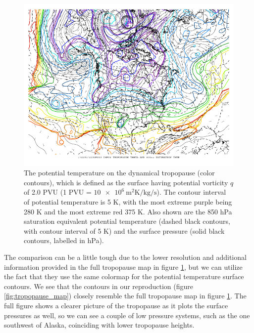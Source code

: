 \documentclass[11pt]{article}
\begin{document}
\begin{figure}[h!]
	\centering
	\includegraphics[width=\textwidth]{2017120312_US_tropo.png} %
	\caption{The potential temperature on the dynamical tropopause (color contours), which is defined as the surface having potential vorticity $q$ of 2.0 PVU (1 PVU = $\SI{10e6}{\m\squared\K\per\kg\per\second}$).  The contour interval of potential temperature is 5 K, with the most extreme purple being 280 K and the most extreme red 375 K. Also shown are the 850 hPa saturation equivalent potential temperature (dashed black contours, with contour interval of 5 K) and the surface pressure (solid black contours, labelled in hPa).}
	\label{fig:2017120312_US_tropo}
\end{figure}

The comparison can be a little tough due to the lower resolution and additional information provided in the full tropopause map in figure \ref{fig:2017120312_US_tropo}, but we can utilize the fact that they use the same colormap for the potential temperature surface contours. We see that the contours in our reproduction (figure \ref{fig:tropopause_map}) closely resemble the full tropopause map in figure \ref{fig:2017120312_US_tropo}. The full figure shows a clearer picture of the tropopause as it plots the surface pressures as well, so we can see a couple of low pressure systems, such as the one southwest of Alaska, coinciding with lower tropopause heights.
\end{document}
